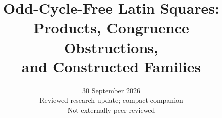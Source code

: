 \documentclass[11pt]{article}
\title{Odd-Cycle-Free Latin Squares:\\
Products, Congruence Obstructions,\\
and Constructed Families}
\author{}
\date{30 September 2026\\\small Reviewed research update; compact companion\\Not externally peer reviewed}
\begin{document}
\maketitle




















\footnotesize


\end{document}
